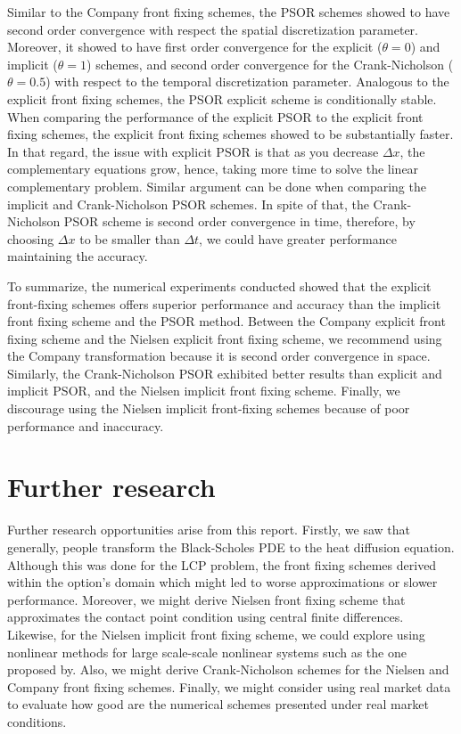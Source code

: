 Similar to the Company front fixing schemes, the PSOR schemes showed to have second order convergence with respect the spatial discretization parameter. Moreover, it showed to have first order convergence for the explicit ($\theta=0$) and implicit ($\theta=1$) schemes, and second order convergence for the Crank-Nicholson ($\theta=0.5$) with respect to the temporal discretization parameter. Analogous to the explicit front fixing schemes, the PSOR explicit scheme is conditionally stable. When comparing the performance of the explicit PSOR to the explicit front fixing schemes, the explicit front fixing schemes showed to be substantially faster. In that regard, the issue with explicit PSOR is that as you decrease $\Delta{x}$, the complementary equations grow, hence, taking more time to solve the linear complementary problem. Similar argument can be done when comparing the implicit and Crank-Nicholson PSOR schemes. In spite of that, the Crank-Nicholson PSOR scheme is second order convergence in time, therefore, by choosing $\Delta{x}$ to be smaller than $\Delta{t}$, we could have greater performance maintaining the accuracy. 

To summarize, the numerical experiments conducted showed that the explicit front-fixing schemes offers superior performance and accuracy than the implicit front fixing scheme and the PSOR method. Between the Company explicit front fixing scheme and the Nielsen explicit front fixing scheme, we recommend using the Company transformation because it is second order convergence in space. Similarly, the Crank-Nicholson PSOR exhibited better results than explicit and implicit PSOR, and the Nielsen implicit front fixing scheme. Finally, we discourage using the Nielsen implicit front-fixing schemes because of poor performance and inaccuracy.

\section{Further research}

Further research opportunities arise from this report. Firstly, we saw that generally, people transform the Black-Scholes PDE to the heat diffusion equation. Although this was done for the LCP problem, the front fixing schemes derived within the option's domain which might led to worse approximations or slower performance. Moreover, we might derive Nielsen front fixing scheme that approximates the contact point condition using central finite differences. Likewise, for the Nielsen implicit front fixing scheme, we could explore using nonlinear methods for large scale-scale nonlinear systems such as the one proposed by\cite{lacruz_2006}. Also, we might derive Crank-Nicholson schemes for the Nielsen and Company front fixing schemes. Finally, we might consider using real market data to evaluate how good are the numerical schemes presented under real market conditions.
